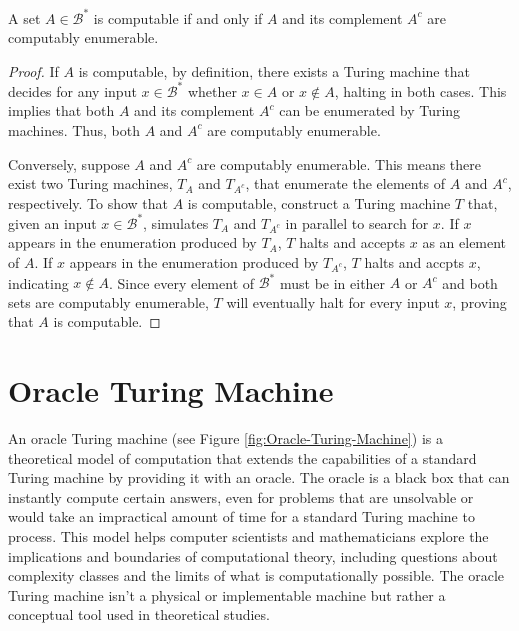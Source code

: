 \begin{proposition}
A set $A \in \mathcal{B}^\ast$ is computable if and only if $A$ and its complement $A^c$ are computably enumerable.
\end{proposition}
\begin{proof}
If $A$ is computable, by definition, there exists a Turing machine that decides for any input $x \in \mathcal{B}^\ast$ whether $x \in A$ or $x \notin A$, halting in both cases. This implies that both $A$ and its complement $A^c$ can be enumerated by Turing machines. Thus, both $A$ and $A^c$ are computably enumerable.

Conversely, suppose $A$ and $A^c$ are computably enumerable. This means there exist two Turing machines, $T_A$ and $T_{A^c}$, that enumerate the elements of $A$ and $A^c$, respectively. To show that $A$ is computable, construct a Turing machine $T$ that, given an input $x \in \mathcal{B}^\ast$, simulates $T_A$ and $T_{A^c}$ in parallel to search for $x$. If $x$ appears in the enumeration produced by $T_A$, $T$ halts and accepts $x$ as an element of $A$. If $x$ appears in the enumeration produced by $T_{A^c}$, $T$ halts and accpts $x$, indicating $x \notin A$. Since every element of $\mathcal{B}^\ast$ must be in either $A$ or $A^c$ and both sets are computably enumerable, $T$ will eventually halt for every input $x$, proving that $A$ is computable.
\end{proof}


%
%

\section{Oracle Turing Machine}
\label{sec:oracle_turing_machine}

An oracle Turing machine (see Figure \ref{fig:Oracle-Turing-Machine}) is a theoretical model of computation that extends the capabilities of a standard Turing machine by providing it with an oracle. The oracle is a black box that can instantly compute certain answers, even for problems that are unsolvable or would take an impractical amount of time for a standard Turing machine to process. This model helps computer scientists and mathematicians explore the implications and boundaries of computational theory, including questions about complexity classes and the limits of what is computationally possible. The oracle Turing machine isn't a physical or implementable machine but rather a conceptual tool used in theoretical studies.

